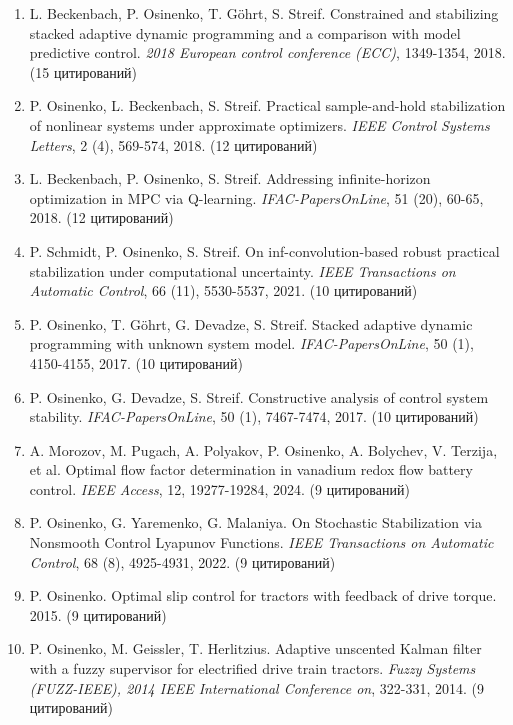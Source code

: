 \documentclass{article}
\begin{document}
\begin{enumerate}
\item L. Beckenbach, P. Osinenko, T. Göhrt, S. Streif. Constrained and stabilizing stacked adaptive dynamic programming and a comparison with model predictive control. \textit{2018 European control conference (ECC)}, 1349-1354, 2018. (15 цитирований)

\item P. Osinenko, L. Beckenbach, S. Streif. Practical sample-and-hold stabilization of nonlinear systems under approximate optimizers. \textit{IEEE Control Systems Letters}, 2 (4), 569-574, 2018. (12 цитирований)

\item L. Beckenbach, P. Osinenko, S. Streif. Addressing infinite-horizon optimization in MPC via Q-learning. \textit{IFAC-PapersOnLine}, 51 (20), 60-65, 2018. (12 цитирований)

\item P. Schmidt, P. Osinenko, S. Streif. On inf-convolution-based robust practical stabilization under computational uncertainty. \textit{IEEE Transactions on Automatic Control}, 66 (11), 5530-5537, 2021. (10 цитирований)

\item P. Osinenko, T. Göhrt, G. Devadze, S. Streif. Stacked adaptive dynamic programming with unknown system model. \textit{IFAC-PapersOnLine}, 50 (1), 4150-4155, 2017. (10 цитирований)

\item P. Osinenko, G. Devadze, S. Streif. Constructive analysis of control system stability. \textit{IFAC-PapersOnLine}, 50 (1), 7467-7474, 2017. (10 цитирований)

\item A. Morozov, M. Pugach, A. Polyakov, P. Osinenko, A. Bolychev, V. Terzija, et al. Optimal flow factor determination in vanadium redox flow battery control. \textit{IEEE Access}, 12, 19277-19284, 2024. (9 цитирований)

\item P. Osinenko, G. Yaremenko, G. Malaniya. On Stochastic Stabilization via Nonsmooth Control Lyapunov Functions. \textit{IEEE Transactions on Automatic Control}, 68 (8), 4925-4931, 2022. (9 цитирований)

\item P. Osinenko. Optimal slip control for tractors with feedback of drive torque. 2015. (9 цитирований)

\item P. Osinenko, M. Geissler, T. Herlitzius. Adaptive unscented Kalman filter with a fuzzy supervisor for electrified drive train tractors. \textit{Fuzzy Systems (FUZZ-IEEE), 2014 IEEE International Conference on}, 322-331, 2014. (9 цитирований)


\end{enumerate}
\end{document}
